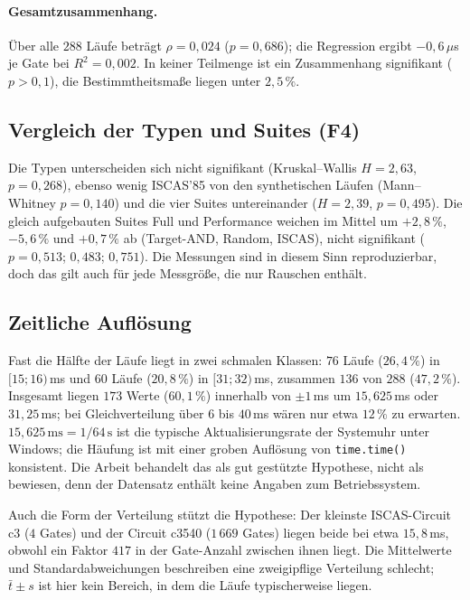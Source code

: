 \paragraph{Gesamtzusammenhang.} Über alle $288$ Läufe beträgt $\rho=0{,}024$ ($p=0{,}686$); die Regression ergibt $-0{,}6\,\mu$s je Gate bei $R^2=0{,}002$. In keiner Teilmenge ist ein Zusammenhang signifikant ($p>0{,}1$), die Bestimmtheitsmaße liegen unter $2{,}5\,\%$.

\subsection{Vergleich der Typen und Suites (F4)}

Die Typen unterscheiden sich nicht signifikant (Kruskal--Wallis $H=2{,}63$, $p=0{,}268$), ebenso wenig ISCAS'85 von den synthetischen Läufen (Mann--Whitney $p=0{,}140$) und die vier Suites untereinander ($H=2{,}39$, $p=0{,}495$). Die gleich aufgebauten Suites Full und Performance weichen im Mittel um $+2{,}8\,\%$, $-5{,}6\,\%$ und $+0{,}7\,\%$ ab (Target-AND, Random, ISCAS), nicht signifikant ($p=0{,}513$; $0{,}483$; $0{,}751$). Die Messungen sind in diesem Sinn reproduzierbar, doch das gilt auch für jede Messgröße, die nur Rauschen enthält.

\subsection{Zeitliche Auflösung}

Fast die Hälfte der Läufe liegt in zwei schmalen Klassen: $76$ Läufe ($26{,}4\,\%$) in $[15;16)$\,ms und $60$ Läufe ($20{,}8\,\%$) in $[31;32)$\,ms, zusammen $136$ von $288$ ($47{,}2\,\%$). Insgesamt liegen $173$ Werte ($60{,}1\,\%$) innerhalb von $\pm1$\,ms um $15{,}625$\,ms oder $31{,}25$\,ms; bei Gleichverteilung über $6$ bis $40$\,ms wären nur etwa $12\,\%$ zu erwarten. $15{,}625\,\mathrm{ms}=1/64\,\mathrm{s}$ ist die typische Aktualisierungsrate der Systemuhr unter Windows; die Häufung ist mit einer groben Auflösung von \texttt{time.time()} konsistent. Die Arbeit behandelt das als gut gestützte Hypothese, nicht als bewiesen, denn der Datensatz enthält keine Angaben zum Betriebssystem.

Auch die Form der Verteilung stützt die Hypothese: Der kleinste ISCAS-Circuit c3 ($4$ Gates) und der Circuit c3540 ($1\,669$ Gates) liegen beide bei etwa $15{,}8$\,ms, obwohl ein Faktor $417$ in der Gate-Anzahl zwischen ihnen liegt. Die Mittelwerte und Standardabweichungen beschreiben eine zweigipflige Verteilung schlecht; $\bar t\pm s$ ist hier kein Bereich, in dem die Läufe typischerweise liegen.

